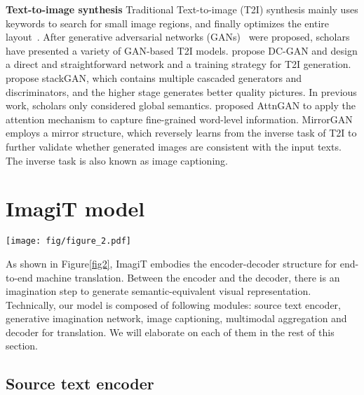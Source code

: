 \documentclass[11pt]{article}
\newcommand{\method}{ImagiT\xspace}
\begin{document}
\textbf{Text-to-image synthesis}   Traditional Text-to-image (T2I) synthesis mainly uses keywords to search for small image regions, and finally optimizes the entire layout~\cite{zhu2007text}. After generative adversarial networks (GANs)~\cite{goodfellow2014generative} were proposed, scholars have presented a variety of GAN-based T2I models. \citet{reed2016generative} propose DC-GAN and design a direct and straightforward network and a training strategy for T2I generation. \citet{zhang2017stackgan} propose stackGAN, which contains multiple cascaded generators and discriminators, and the higher stage generates better quality pictures. In previous work, scholars only considered global semantics. \citet{xu2018attngan} proposed AttnGAN to apply the attention mechanism to capture fine-grained word-level information. MirrorGAN~\cite{qiao2019mirrorgan} employs a mirror structure, which reversely learns from the inverse task of T2I to further validate whether generated images are consistent with the input texts. The inverse task is also known as image captioning. 
\section{ImagiT model}
\label{sec:method}
\begin{figure*}[t]
\centering
\texttt{[image: fig/figure\_2.pdf]} \caption{Overview of the framework of the proposed \method. $F_{0}$ and $F_{1}$ are text-to-image converters, sharing similar structures, comprising of perceptron, residual, and unsampling blocks. L$\times$ represents L identical layers. Noting that we only need to obtain the generated visual feature to guide the translation, for the whole pipeline, up-sampling this feature to image is redundant.}
\label{fig2}
\end{figure*}

As shown in Figure\ref{fig2}, \method embodies the encoder-decoder structure for end-to-end machine translation. Between the encoder and the decoder, there is an imagination step to generate semantic-equivalent visual representation. Technically, our model is composed of following modules: source text encoder, generative imagination network, image captioning, multimodal aggregation and decoder for translation. We will elaborate on each of them in the rest of this section.

\subsection{Source text encoder}
\end{document}
